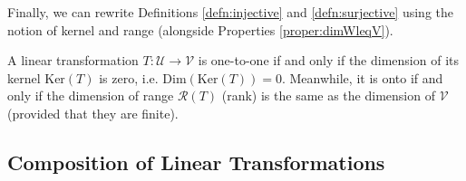 Finally, we can rewrite Definitions \ref{defn:injective} and \ref{defn:surjective} using the notion of kernel and range (alongside Properties \ref{proper:dimWleqV}).
\begin{proper}
A linear transformation $T: \mathcal{U} \to \mathcal{V}$ is one-to-one if and only if the dimension of its kernel $\text{Ker}(T)$ is zero, i.e. $\text{Dim}(\text{Ker}(T)) = 0$. Meanwhile, it is onto if and only if the dimension of range $\mathcal{R}(T)$ (rank) is the same as the dimension of $\mathcal{V}$ (provided that they are finite).
\end{proper}

\subsection{Composition of Linear Transformations}

